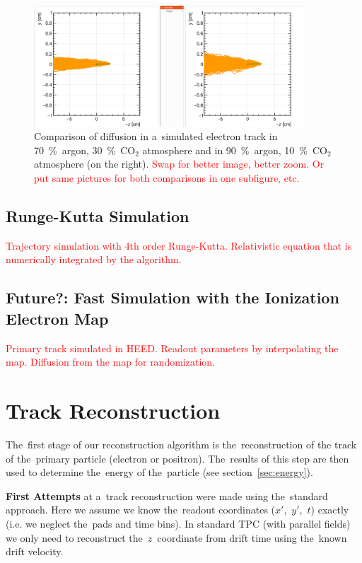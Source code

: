\documentclass[]{article}
\begin{document}
			\begin{figure}
				\centering
				\includegraphics[width=0.9\textwidth]{diff_comp.png}
				\caption{Comparison of diffusion in a~simulated electron track in 70~\%~argon, 30~\%~CO$_2$ atmosphere and in 90~\%~argon, 10~\%~CO$_2$ atmosphere (on the right). \textcolor{red}{Swap for better image, better zoom. Or put same pictures for both comparisons in one subfigure, etc.}}
				\label{fig:diffcomp}
			\end{figure}
			
		\subsection{Runge-Kutta Simulation}
		\label{sec:rks}
			\textcolor{red}{Trajectory simulation with 4th order Runge-Kutta. Relativistic equation that is numerically integrated by the algorithm.}
			
		\subsection{Future?: Fast Simulation with the Ionization Electron Map}
			\textcolor{red}{Primary track simulated in HEED. Readout parameters by interpolating the map. Diffusion from the map for randomization.}
	
	\section{Track Reconstruction}
	\label{sec:track}
		The~first stage of our reconstruction algorithm is the~reconstruction of the track of the~primary particle (electron or positron). The~results of this step are then used to determine the~energy of the~particle (see section~\ref{sec:energy}).
		
		\textbf{First Attempts} at a~track reconstruction were made using the~standard approach. Here we assume we know the~readout coordinates ($x'$,~$y'$,~$t$) exactly (i.e. we neglect the~pads and time bins). In standard TPC (with parallel fields) we only need to reconstruct the~$z$~coordinate from drift time using the~known drift velocity.
		
\end{document}
